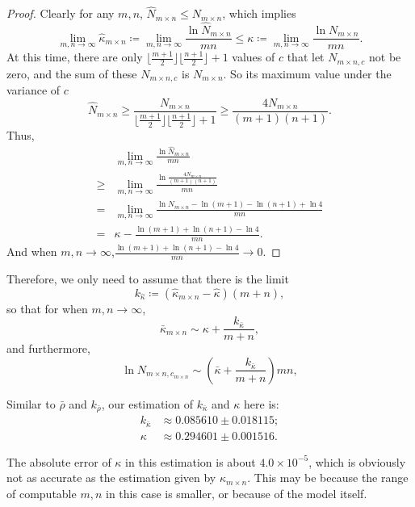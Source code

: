 \documentclass[11pt]{article}
\begin{document}
    \begin{proof}
        Clearly for any $m,n$, $\hat{N}_{m\times n}\leq N_{m\times n}$, which implies
        \[
            \lim_{m,n\rightarrow\infty}\hat{\kappa}_{m\times n} \coloneq\lim_{m,n\rightarrow\infty}\frac{\ln \hat{N}_{m\times n}}{mn} \leq\kappa \coloneq \lim_{m,n\rightarrow\infty}\frac{\ln N_{m\times n}}{mn}.
        \]
        At this time, there are only $\lfloor\frac{m+1}{2}\rfloor\lfloor\frac{n+1}{2}\rfloor+1$ values of $c$ that let $N_{m\times n,c}$ not be zero,
        and the sum of these $N_{m\times n,c}$ is $N_{m\times n}$.
        So its maximum value under the variance of $c$
        \[
            \hat{N}_{m\times n}\geq \frac{N_{m\times n}}{\lfloor\frac{m+1}{2}\rfloor\lfloor\frac{n+1}{2}\rfloor+1} \geq \frac{4N_{m\times n}}{(m+1)(n+1)}.
        \]
        Thus,
        \begin{align*}
            & \lim_{m,n\rightarrow\infty}\frac{\ln \hat{N}_{m\times n}}{mn}\\
            \geq & \lim_{m,n\rightarrow\infty}\frac{\ln \frac{4N_{m\times n}}{(m+1)(n+1)}}{mn}\\
            = & \lim_{m,n\rightarrow\infty}\frac{\ln N_{m\times n}-\ln (m+1) -\ln (n+1) +\ln 4}{mn}\\
            =& \kappa -\frac{\ln (m+1) +\ln (n+1) -\ln 4}{mn}.
        \end{align*}
        And when $m,n\rightarrow\infty$,$\frac{\ln (m+1) +\ln (n+1) -\ln 4}{mn}\rightarrow0$.
    \end{proof}

    Therefore, we only need to assume that there is the limit
    \[
        k_{\hat{\kappa}} \coloneq (\hat{\kappa}_{m\times n}-\hat{\kappa})(m+n),
    \]
    so that for when $m,n\rightarrow\infty$,
    \[
        \bar{\kappa}_{m\times n} \sim \kappa+\frac{k_{\bar{\kappa}}}{m+n},
    \]
    and furthermore,
    \[
        \ln N_{m\times n, c_{m\times n}} \sim (\bar{\kappa}+\frac{k_{\bar{\kappa}}}{m+n})mn,
    \]

    Similar to $\bar{\rho}$ and $k_{\bar{\rho}}$, our estimation of $k_{\bar{\kappa}}$ and $\kappa$ here is:
    \begin{align*}
        k_{\bar{\kappa}} &\approx 0.085610\pm0.018115; \\
        \kappa           &\approx 0.294601\pm0.001516.
    \end{align*}

    The absolute error of $\kappa$ in this estimation is about $4.0 \times10^{-5}$, which is obviously not as accurate as the estimation given by $\kappa_{m\times n}$.
    This may be because the range of computable $m, n$ in this case is smaller, or because of the model itself.
\end{document}

